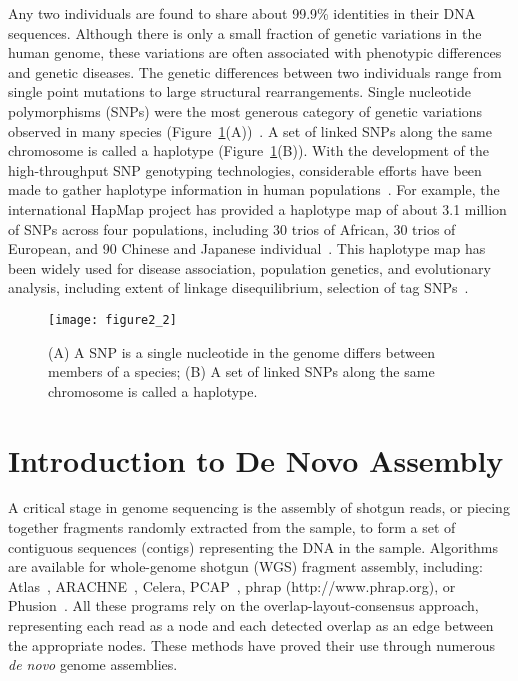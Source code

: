 \begin{description}
Any two individuals are found to share about 99.9\% identities in
their DNA sequences. Although there is only a small fraction of
genetic variations in the human genome, these variations are often
associated with phenotypic differences and genetic diseases. The
genetic differences between two individuals range from single
point mutations to large structural rearrangements. Single
nucleotide polymorphisms (SNPs) were the most generous category of
genetic variations observed in many species
(Figure~\ref{fig:Figure2.2}(A))~\cite{Frazer2007a,Helmuth2001}. A
set of linked SNPs along the same chromosome is called a haplotype
(Figure~\ref{fig:Figure2.2}(B)). With the development of the
high-throughput SNP genotyping technologies, considerable efforts
have been made to gather haplotype information in human
populations~\cite{Altshuler2005,Chang2006}. For example, the
international HapMap project has provided a haplotype map of about
3.1 million of SNPs across four populations, including 30 trios of
African, 30 trios of European, and 90 Chinese and Japanese
individual~\cite{Frazer2007}. This haplotype map has been widely
used for disease association, population genetics, and
evolutionary analysis, including extent of linkage disequilibrium,
selection of tag
SNPs~\cite{Chang2006,Frazer2007,Huang2008,Huang2005,Huang2005a,Voight2006}.

\begin{figure}
    \centering
    \texttt{[image: figure2\_2]}
    \caption[An example for SNPs and haplotypes]{
        (A) A SNP is a single nucleotide in the genome differs between members of a
        species;
        (B) A set of linked SNPs along the same chromosome is called a haplotype.
        }
    \label{fig:Figure2.2}
\end{figure}
    
\end{description}



\section{Introduction to De Novo Assembly}

A critical stage in genome sequencing is the assembly of shotgun reads, o\-r piecing together fragments randomly extracted from the sample, to form a set of contiguous sequences (contigs) representing the DNA in the sample.
Algorithms are available for whole-genome shotgun (WGS) fragment assembly, including: Atlas~\cite{Havlak2004}, ARACHNE~\cite{Batzoglou2002}, Celera, PCAP~\cite{Huang2003}, phrap (http://www.phrap.org), or Phusion~\cite{Mullikin2003}. All these programs rely on the overlap-layout-consensus approach, representing each read as a node and each detected overlap as an edge between the appropriate nodes.
These methods have proved their use through numerous {\em de novo} genome assemblies.

